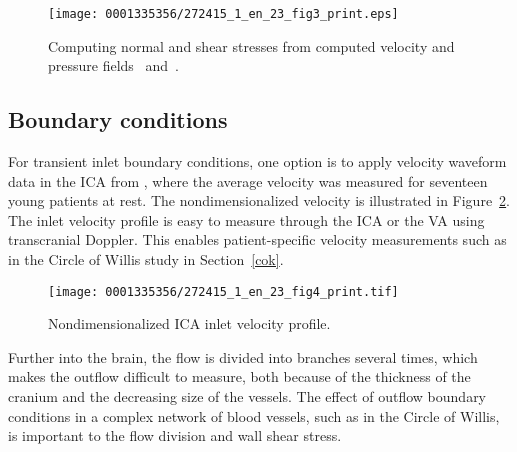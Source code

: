 \begin{figure}[!b]
\texttt{[image: 0001335356/272415\_1\_en\_23\_fig3\_print.eps]}
\caption{Computing normal and shear stresses from computed
velocity and pressure fields ~and~.}
\label{fig:kvs-2:stress_code}
\end{figure}

\subsection{Boundary conditions} \label{resistance_bcs}

For transient inlet boundary conditions, one option is to apply
velocity waveform data in the ICA from \citet{FordAlperinLeeEtAl2005},
where the average velocity was measured for seventeen young patients
at rest. The nondimensionalized velocity is illustrated in
Figure~\ref{fig:kvs-2:ford}. The inlet velocity profile is easy to
measure through the ICA or the VA using transcranial Doppler. This
enables patient-specific velocity measurements such as in the Circle of Willis
study in Section~\ref{cok}.

\begin{figure}[!t]
\centering
\texttt{[image: 0001335356/272415\_1\_en\_23\_fig4\_print.tif]}
\caption{Nondimensionalized ICA inlet velocity profile.}
\label{fig:kvs-2:ford}\vspace*{10pt}
\end{figure}

Further into the brain, the flow is divided into branches several
times, which makes the outflow difficult to measure, both because of
the thickness of the cranium and the decreasing size of the vessels.
The effect of outflow boundary conditions in a complex network of
blood vessels, such as in the Circle of Willis, is important to the
flow division and wall shear stress.

